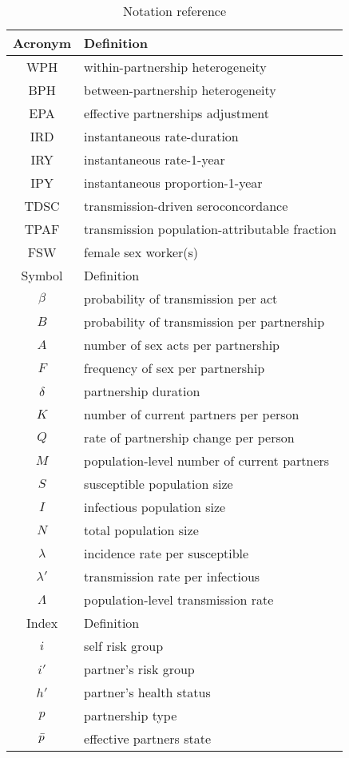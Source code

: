 \begin{table}
  \centering
  \caption{Notation reference}
  \label{tab:not}
  \begin{tabular}{cl}
  \toprule
  Acronym & Definition \\
  \midrule
  WPH  & within-partnership heterogeneity \\
  BPH  & between-partnership heterogeneity \\
  EPA  & effective partnerships adjustment \\
  IRD  & instantaneous rate-duration \\
  IRY  & instantaneous rate-1-year \\
  IPY  & instantaneous proportion-1-year \\
  TDSC & transmission-driven seroconcordance \\
  TPAF & transmission population-attributable fraction \\
  FSW  & female sex worker(s) \\
  \midrule
  Symbol & Definition \\
  \midrule
  $\beta$    & probability of transmission per act \\
  $B$        & probability of transmission per partnership \\
  $A$        & number of sex acts per partnership \\
  $F$        & frequency of sex per partnership \\
  $\delta$   & partnership duration \\
  $K$        & number of current partners per person \\
  $Q$        & rate of partnership change per person \\
  $M$        & population-level number of current partners \\
  $S$        & susceptible population size \\
  $I$        & infectious population size \\
  $N$        & total population size \\
  $\lambda$  & incidence rate per susceptible \\
  $\lambda'$ & transmission rate per infectious \\
  $\Lambda$  & population-level transmission rate \\
  \midrule
  Index & Definition \\
  \midrule
  $i$  & self risk group \\
  $i'$ & partner's risk group \\
  $h'$ & partner's health status \\
  $p$  & partnership type \\
  $\bar{p}$ & effective partners state \\
  \bottomrule
  \end{tabular}
\end{table}
